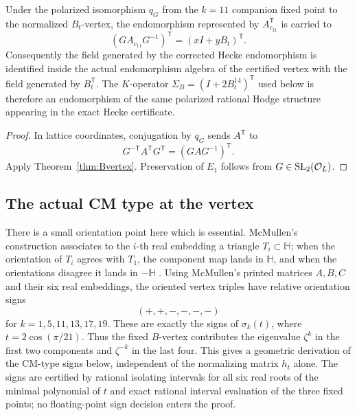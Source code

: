 \begin{corollary}\label{cor:Gtransport}
Under the polarized isomorphism $q_G$ from the $k=11$ companion fixed point to the normalized $B_t$-vertex, the endomorphism represented by $A_{c_{11}}^{\mathsf T}$ is carried to
\[
 (GA_{c_{11}}G^{-1})^{\mathsf T}=(xI+yB_t)^{\mathsf T}.
\]
Consequently the field generated by the corrected Hecke endomorphism is identified inside the actual endomorphism algebra of the certified vertex with the field generated by $B_t^{\mathsf T}$. The $K$-operator $\Sigma_B=(I+2B_t^{14})^{\mathsf T}$ used below is therefore an endomorphism of the same polarized rational Hodge structure appearing in the exact Hecke certificate.
\end{corollary}
\begin{proof}
In lattice coordinates, conjugation by $q_G$ sends $A^{\mathsf T}$ to
\[
 G^{-\mathsf T}A^{\mathsf T}G^{\mathsf T}=(GAG^{-1})^{\mathsf T}.
\]
Apply Theorem~\ref{thm:Bvertex}.  Preservation of $E_1$ follows from $G\in\mathrm{SL}_2(\mathcal O_L)$.
\end{proof}


\subsection{The actual CM type at the vertex}\label{sec:actualcmtype}

There is a small orientation point here which is essential.  McMullen's construction
associates to the $i$-th real embedding a triangle $T_i\subset\mathbb H$; when the
orientation of $T_i$ agrees with $T_1$, the component map lands in $\mathbb H$, and
when the orientations disagree it lands in $-\mathbb H$ \cite[Thm.~6.3 and Eq.~(6.1)]{McMullen2026}.
Using McMullen's printed matrices $A,B,C$ and their six real embeddings, the oriented
vertex triples have relative orientation signs
\[
 (+,+,-,-,-,-)
\]
for $k=1,5,11,13,17,19$.  These are exactly the signs of
$\sigma_k(t)$, where $t=2\cos(\pi/21)$.  Thus the fixed $B$-vertex contributes the
eigenvalue $\zeta^{k}$ in the first two components and $\zeta^{-k}$ in the last four.
This gives a geometric derivation of the CM-type signs below, independent of the
normalizing matrix $h_t$ alone.  The signs are certified by rational isolating intervals
for all six real roots of the minimal polynomial of $t$ and exact rational interval
evaluation of the three fixed points; no floating-point sign decision enters the proof.

